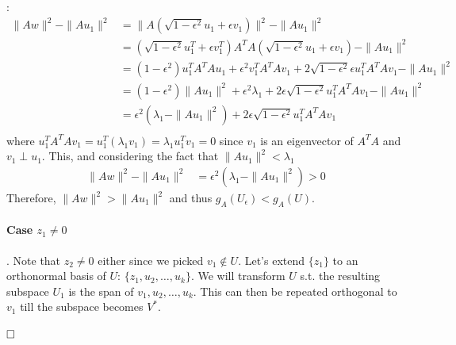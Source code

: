 \documentclass{article}
\newenvironment{proofof}[1]{\smallskip\noindent{\bf Proof of #1}:}{$\hfill \Box$\\}
\begin{document}
\begin{proofof}{Lemma~\ref{lem:C}}
\begin{align*}
\|Aw\|^2 - \|Au_1\|^2 &= \|A(\sqrt{1-\epsilon^2}u_1+\epsilon v_1)\|^2 - \|Au_1\|^2\\
&=(\sqrt{1-\epsilon^2}u_1^T+\epsilon v_1^T)A^TA(\sqrt{1-\epsilon^2}u_1+\epsilon v_1) - \|Au_1\|^2\\
&=(1-\epsilon^2)u_1^TA^TAu_1+\epsilon^2v_1^TA^TAv_1+2\sqrt{1-\epsilon^2}\epsilon u_1^TA^TAv_1 - \|Au_1\|^2\\
&=(1-\epsilon^2)\|Au_1\|^2+\epsilon^2\lambda_1+2\epsilon \sqrt{1-\epsilon^2} u_1^TA^TAv_1 - \|Au_1\|^2 \\
&= \epsilon^2 (\lambda_1 - \|Au_1\|^2) + 2\epsilon \sqrt{1-\epsilon^2} u_1^TA^TAv_1 \\
\end{align*}
where $ u_1^TA^TAv_1 = u_1^T (\lambda_1 v_1)= \lambda_1 u_1^Tv_1 =0$ since $v_1$ is an eigenvector of $A^TA$ and $v_1 \perp u_1$. This, and considering the fact that $\|Au_1\|^2 < \lambda_1$
\begin{align*}
        \|Aw\|^2 - \|Au_1\|^2 &= \epsilon^2(\lambda_1 - \|Au_1\|^2) > 0
\end{align*}
Therefore, $\|Aw\|^2 > \|Au_1\|^2$ and thus $g_A(U_\epsilon) < g_A (U)$.

\paragraph{Case \boldmath $z_1 \neq 0$}. Note that $z_2 \neq 0$ either since we picked $v_1 \notin U$. Let's extend $\{z_1\}$ to an orthonormal basis of $U$:  $\{z_1,u_2, \ldots, u_k\}$. We will transform $U$ s.t. the resulting subspace $U_1$ is the span of $v_1, u_2,\ldots, u_k$. This can then be repeated orthogonal to $v_1$ till the subspace becomes $V^*$.


\end{proofof}
\end{document}
